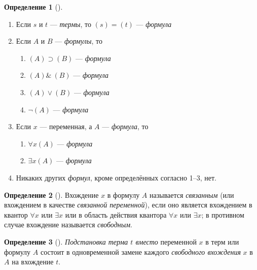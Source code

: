 \documentclass[a4paper, 12pt]{article}  %
\DeclareMathOperator{\conj}{\mathbb{\&}}
\theoremstyle{definition}
\newtheorem*{definition}{Определение}
\begin{document}
	\begin{definition}[]
		\leavevmode				
		\begin{enumerate}
			\setlength\itemsep{-3pt}	
			\item Если $s$ и $t$ --- \textit{термы}, то $(s)=(t)$ --- \textit{формула}
			\item Если $A$ и $B$ --- \textit{формулы}, то
			\begin{multicols}{3}
				\begin{enumerate}
				\item $(A) \supset (B)$ --- \textit{формула}
				\item $(A) \conj\: (B)$ --- \textit{формула}
				\item $(A) \vee (B)$    --- \textit{формула}
				\item $\neg (A)$        --- \textit{формула}
				\end{enumerate}
			\end{multicols}
			\item Если $x$ --- переменная, а $A$ --- \textit{формула}, то 
			\begin{multicols}{3}
				\begin{enumerate}
				\item $\forall x (A)$ --- \textit{формула}
				\item $\exists x (A)$ --- \textit{формула}
				\end{enumerate}
			\end{multicols}
			\item Никаких других \textit{формул}, кроме определённых согласно 1--3, нет.
		\end{enumerate}
	\end{definition}
	
	\begin{definition}[]
		Вхождение $x$ в формулу $A$ называется \textit{связанным} (или вхождением в качестве 
		\textit{связанной переменной}), если оно является вхождением в квантор $\forall x$ или $\exists x$
		или в область действия квантора $\forall x$ или $\exists x$; в противном случае вхождение
		называется \textit{свободным}. 	
	\end{definition}

	\begin{definition}[]
		\textit{Подстановка терма $t$ вместо} переменной $x$ в терм или формулу $A$ состоит в одновременной
		 замене	каждого \textit{свободного вхождения} $x$ в $A$ на вхождение $t$.		
	\end{definition}
\end{document}

